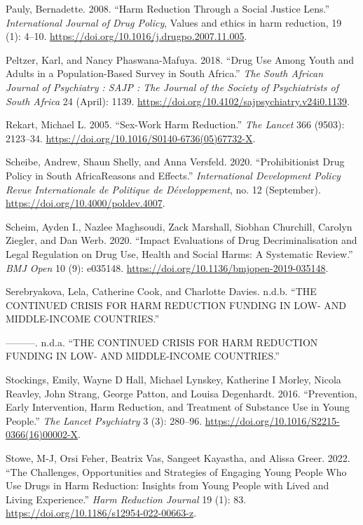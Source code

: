 \documentclass[
  letterpaper,
  DIV=11,
  numbers=noendperiod]{scrartcl}
\newlength{\cslhangindent}
\newenvironment{CSLReferences}[2] %
 {\begin{list}{}{%
  \setlength{\itemindent}{0pt}
  \setlength{\leftmargin}{0pt}
  \setlength{\parsep}{0pt}
  \ifodd #1
   \setlength{\leftmargin}{\cslhangindent}
   \setlength{\itemindent}{-1\cslhangindent}
  \fi
  \setlength{\itemsep}{#2\baselineskip}}}
 {\end{list}}
\begin{document}
\begin{CSLReferences}{1}{0}
Pauly, Bernadette. 2008. {``Harm Reduction Through a Social Justice
Lens.''} \emph{International Journal of Drug Policy}, Values and ethics
in harm reduction, 19 (1): 4--10.
\url{https://doi.org/10.1016/j.drugpo.2007.11.005}.

Peltzer, Karl, and Nancy Phaswana-Mafuya. 2018. {``Drug Use Among Youth
and Adults in a Population-Based Survey in South Africa.''} \emph{The
South African Journal of Psychiatry : SAJP : The Journal of the Society
of Psychiatrists of South Africa} 24 (April): 1139.
\url{https://doi.org/10.4102/sajpsychiatry.v24i0.1139}.

Rekart, Michael L. 2005. {``Sex-Work Harm Reduction.''} \emph{The
Lancet} 366 (9503): 2123--34.
\url{https://doi.org/10.1016/S0140-6736(05)67732-X}.

Scheibe, Andrew, Shaun Shelly, and Anna Versfeld. 2020.
{``Prohibitionist Drug Policy in South Africa{\textemdash}Reasons and
Effects.''} \emph{International Development Policy \textbar{} Revue
Internationale de Politique de Développement}, no. 12 (September).
\url{https://doi.org/10.4000/poldev.4007}.

Scheim, Ayden I., Nazlee Maghsoudi, Zack Marshall, Siobhan Churchill,
Carolyn Ziegler, and Dan Werb. 2020. {``Impact Evaluations of Drug
Decriminalisation and Legal Regulation on Drug Use, Health and Social
Harms: A Systematic Review.''} \emph{BMJ Open} 10 (9): e035148.
\url{https://doi.org/10.1136/bmjopen-2019-035148}.

Serebryakova, Lela, Catherine Cook, and Charlotte Davies. n.d.b. {``THE
CONTINUED CRISIS FOR HARM REDUCTION FUNDING IN LOW- AND MIDDLE-INCOME
COUNTRIES.''}

---------. n.d.a. {``THE CONTINUED CRISIS FOR HARM REDUCTION FUNDING IN
LOW- AND MIDDLE-INCOME COUNTRIES.''}

Stockings, Emily, Wayne D Hall, Michael Lynskey, Katherine I Morley,
Nicola Reavley, John Strang, George Patton, and Louisa Degenhardt. 2016.
{``Prevention, Early Intervention, Harm Reduction, and Treatment of
Substance Use in Young People.''} \emph{The Lancet Psychiatry} 3 (3):
280--96. \url{https://doi.org/10.1016/S2215-0366(16)00002-X}.

Stowe, M-J, Orsi Feher, Beatrix Vas, Sangeet Kayastha, and Alissa Greer.
2022. {``The Challenges, Opportunities and Strategies of Engaging Young
People Who Use Drugs in Harm Reduction: Insights from Young People with
Lived and Living Experience.''} \emph{Harm Reduction Journal} 19 (1):
83. \url{https://doi.org/10.1186/s12954-022-00663-z}.


\end{CSLReferences}
\end{document}
